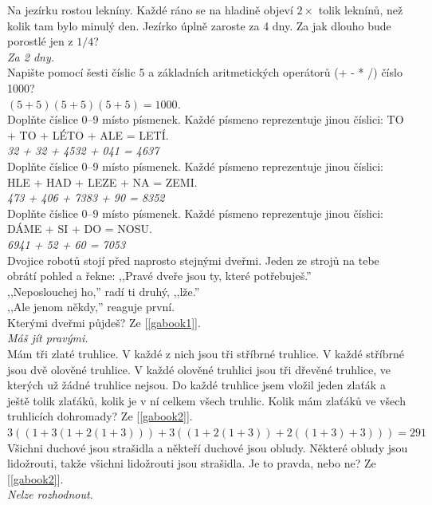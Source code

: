 \begin{multicols}{\value{columnsgames}}
\noindent
Na jezírku rostou lekníny. Každé ráno se na hladině objeví $2\times$
tolik leknínů, než kolik tam bylo minulý den. Jezírko úplně zaroste
za 4 dny. Za jak dlouho bude porostlé jen z $1/4$?\\[1 mm]
{\sl Za 2 dny.}\\

\noindent
Napište pomocí šesti číslic 5 a základních aritmetických operátorů
(+ - * /) číslo 1000?\\[1 mm]
{\sl $(5+5)(5+5)(5+5)=1000$.}\\

\noindent
Doplňte číslice 0--9 místo písmenek. Každé písmeno reprezentuje 
jinou číslici: TO + TO + LÉTO + ALE = LETÍ.\\[1 mm]
{\sl 32 + 32 + 4532 + 041 = 4637}\\

\noindent
Doplňte číslice 0--9 místo písmenek. Každé písmeno reprezentuje 
jinou číslici: HLE + HAD + LEZE + NA = ZEMI.\\[1 mm]
{\sl 473 + 406 + 7383 + 90 = 8352}\\

\noindent
Doplňte číslice 0--9 místo písmenek. Každé písmeno reprezentuje 
jinou číslici: DÁME + SI + DO = NOSU.\\[1 mm]
{\sl 6941 + 52 + 60 = 7053}\\

\noindent
Dvojice robotů stojí před naprosto stejnými dveřmi. Jeden ze strojů na tebe
obrátí pohled a řekne: ,,Pravé dveře jsou ty, které potřebuješ.''\\
,,Neposlouchej ho,'' radí ti druhý, ,,lže.''\\
,,Ale jenom někdy,'' reaguje první.\\
Kterými dveřmi půjdeš? Ze [\ref{gabook1}].\\[1 mm]
{\sl Máš jít pravými.}\\

\noindent
Mám tři zlaté truhlice. V každé z nich jsou tři stříbrné truhlice. V každé
stříbrné jsou dvě olověné truhlice. V každé olověné truhlici jsou tři dřevěné
truhlice, ve kterých už žádné truhlice nejsou. Do každé truhlice jsem vložil
jeden zlaťák a ještě tolik zlaťáků, kolik je v ní celkem všech truhlic. Kolik
mám zlaťáků ve všech truhlicích dohromady? Ze [\ref{gabook2}].\\[1 mm]
{\sl $3((1+3(1+2(1+3)))+3((1+2(1+3))+2((1+3)+3))) = 291$}\\

\noindent
Všichni duchové jsou strašidla a někteří duchové jsou obludy. Některé obludy
jsou lidožrouti, takže všichni lidožrouti jsou strašidla. Je to pravda,
nebo ne? Ze [\ref{gabook2}].\\[1 mm]
{\sl Nelze rozhodnout.}\\


\end{multicols}

